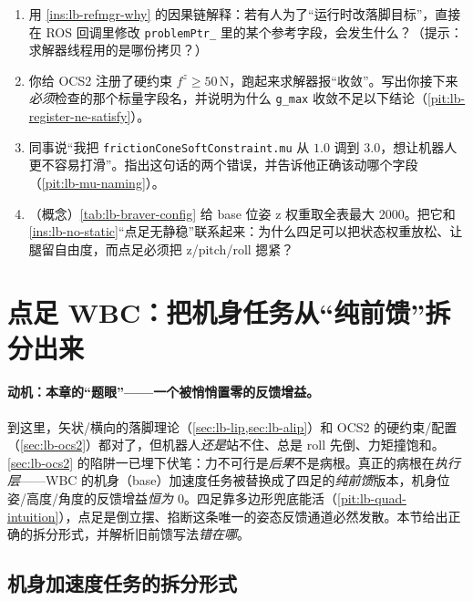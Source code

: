 \begin{practice}
\begin{enumerate}
  \item 用 \cref{ins:lb-refmgr-why} 的因果链解释：若有人为了“运行时改落脚目标”，直接在 ROS 回调里修改 \texttt{problemPtr\_} 里的某个参考字段，会发生什么？（提示：求解器线程用的是哪份拷贝？）
  \item 你给 OCS2 注册了硬约束 $f^z\ge 50\,\mathrm{N}$，跑起来求解器报“收敛”。写出你接下来\emph{必须}检查的那个标量字段名，并说明为什么 \texttt{g\_max} 收敛不足以下结论（\cref{pit:lb-register-ne-satisfy}）。
  \item 同事说“我把 \texttt{frictionConeSoftConstraint.\allowbreak mu} 从 $1.0$ 调到 $3.0$，想让机器人更不容易打滑”。指出这句话的两个错误，并告诉他正确该动哪个字段（\cref{pit:lb-mu-naming}）。
  \item （概念）\cref{tab:lb-braver-config} 给 base 位姿 z 权重取全表最大 $2000$。把它和 \cref{ins:lb-no-static}“点足无静稳”联系起来：为什么四足可以把状态权重放松、让腿留自由度，而点足必须把 z/pitch/roll 摁紧？
\end{enumerate}
\end{practice}

\section{点足 WBC：把机身任务从“纯前馈”拆分出来}
\label{sec:lb-wbc}

\paragraph{动机：本章的“题眼”——一个被悄悄置零的反馈增益。}
到这里，矢状/横向的落脚理论（\cref{sec:lb-lip,sec:lb-alip}）和 OCS2 的硬约束/配置（\cref{sec:lb-ocs2}）都对了，但机器人\emph{还是}站不住、总是 roll 先倒、力矩撞饱和。\cref{sec:lb-ocs2} 的陷阱一已埋下伏笔：力不可行是\emph{后果}不是病根。真正的病根在\emph{执行层}——WBC 的机身（base）加速度任务被替换成了四足的\emph{纯前馈}版本，机身位姿/高度/角度的反馈增益\emph{恒为 $0$}。四足靠多边形兜底能活（\cref{pit:lb-quad-intuition}），点足是倒立摆、掐断这条唯一的姿态反馈通道必然发散。本节给出正确的拆分形式，并解析旧前馈写法\emph{错在哪}。

\subsection{机身加速度任务的拆分形式}
\label{subsec:lb-base-split}

